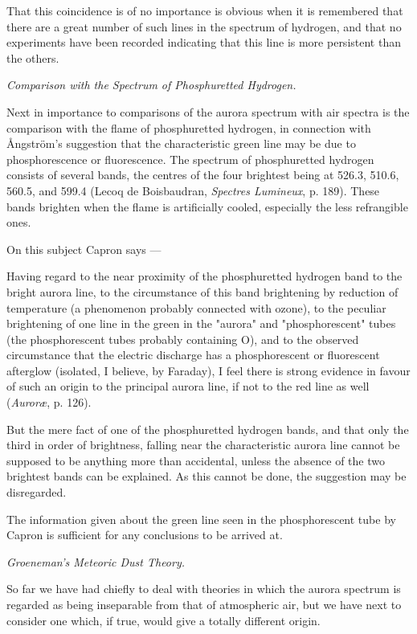 \documentclass[a4paper, 12pt, oneside, polutonikogreek, english]{article}
\begin{document}
That this coincidence is of no importance is obvious when it is remembered that there are a great number of such lines in the spectrum of hydrogen, and that no experiments have been recorded indicating that this line is more persistent than the others.

\emph{Comparison with the Spectrum of Phosphuretted Hydrogen.}

Next in importance to comparisons of the aurora spectrum with air spectra is the comparison with the flame of phosphuretted hydrogen, in connection with Ångström's suggestion that the characteristic green line may be due to phosphorescence or fluorescence. The spectrum of phosphuretted hydrogen consists of several bands, the centres of the four brightest being at 526.3, 510.6, 560.5, and 599.4 (Lecoq de Boisbaudran, \emph{Spectres Lumineux}, p. 189). These bands brighten when the flame is artificially cooled, especially the less refrangible ones.

On this subject Capron says ---

Having regard to the near proximity of the phosphuretted hydrogen band to the bright aurora line, to the circumstance of this band brightening by reduction of temperature (a phenomenon probably connected with ozone), to the peculiar brightening of one line in the green in the "aurora" and "phosphorescent" tubes (the phosphorescent tubes probably containing O), and to the observed circumstance that the electric discharge has a phosphorescent or fluorescent afterglow (isolated, I believe, by Faraday), I feel there is strong evidence in favour of such an origin to the principal aurora line, if not to the red line as well (\emph{Auroræ}, p. 126).

But the mere fact of one of the phosphuretted hydrogen bands, and that only the third in order of brightness, falling near the characteristic aurora line cannot be supposed to be anything more than accidental, unless the absence of the two brightest bands can be explained. As this cannot be done, the suggestion may be disregarded.

The information given about the green line seen in the phosphorescent tube by Capron is sufficient for any conclusions to be arrived at.

\emph{Groeneman's Meteoric Dust Theory.}

So far we have had chiefly to deal with theories in which the aurora spectrum is regarded as being inseparable from that of atmospheric air, but we have next to consider one which, if true, would give a totally different origin.
\end{document}

